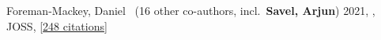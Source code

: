 



\item[{\color{numcolor}\scriptsize1}] Foreman-Mackey, Daniel \etal\ ({16} other co-authors, incl.\ \textbf{Savel, Arjun}) 2021, , JOSS, [\href{https://ui.adsabs.harvard.edu/abs/2021JOSS....6.3285F}{248 citations}]

